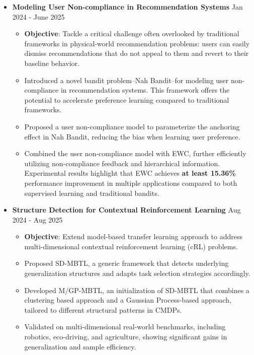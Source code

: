 \documentclass[10pt, letterpaper]{article}
\newenvironment{highlights}{
    \begin{itemize}[
        topsep=0.10 cm,
        parsep=0.10 cm,
        partopsep=0pt,
        itemsep=0pt,
        leftmargin=0 cm + 10pt
    ]
}{
    \end{itemize}
} %
\newenvironment{highlightsforbulletentries}{
    \begin{itemize}[
        topsep=0.10 cm,
        parsep=0.10 cm,
        partopsep=0pt,
        itemsep=0pt,
        leftmargin=10pt
    ]
}{
    \end{itemize}
} %
\begin{document}
\begin{highlights}
        \item \textbf{Modeling User Non-compliance in Recommendation Systems} \hfill Jan 2024 - June 2025
        \begin{highlightsforbulletentries}
        \vspace{-0.1cm}
        \item \textbf{Objective}: Tackle a critical challenge often overlooked by traditional frameworks in physical-world recommendation problems: users can easily dismiss recommendations that do not appeal to them and revert to their baseline behavior.
        \item Introduced a novel bandit problem--Nah Bandit--for modeling user non-compliance in recommendation systems. This framework offers the potential to accelerate preference learning compared to traditional frameworks.
        \item Proposed a user non-compliance model to parameterize the anchoring effect in Nah Bandit, reducing the bias when learning user preference.
        \item Combined the user non-compliance model with EWC, further efficiently utilizing non-compliance feedback and hierarchical information. Experimental results highlight that EWC achieves \textbf{at least 15.36\%} performance improvement in multiple applications compared to both supervised learning and traditional bandits.
        \end{highlightsforbulletentries}
        \vspace{-0.1cm}
        \item \textbf{Structure Detection for Contextual Reinforcement Learning} \hfill Aug 2024 - Aug 2025
        \begin{highlightsforbulletentries}
        \vspace{-0.1cm}
        \item \textbf{Objective}: Extend model-based transfer learning approach to address multi-dimensional contextual reinforcement learning (cRL) problems.
        \item Proposed SD-MBTL, a generic framework that detects underlying generalization structures and adapts task selection strategies accordingly.
        \item Developed M/GP-MBTL, an initialization of SD-MBTL that combines a clustering based approach and a Gaussian Process-based approach, tailored to different structural patterns in CMDPs.
        \item Validated on multi-dimensional real-world benchmarks, including robotics, eco-driving, and agriculture, showing significant gains in generalization and sample efficiency.
        \end{highlightsforbulletentries}
        \vspace{-0.1cm}
    \end{highlights}
\end{document}
